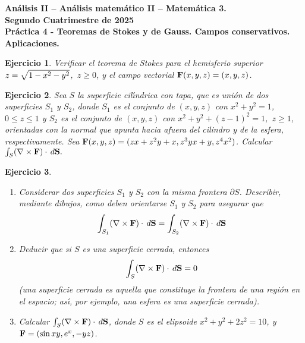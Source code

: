 \documentclass[11pt,a4paper,pdftex]{amsart}
\newtheorem{ej}{Ejercicio}%
\newcommand{\bej}[1]{\begin{ej}\rm{#1}}
\newcommand{\eej}{\end{ej}\vspace{-0.2cm}}
\renewcommand{\bf}{\textbf}
\newcommand{\0}{\mathbb O}
\newcommand{\8}{\infty}
\begin{document}

\begin{center}

\bf{\Large An\'alisis II -- An\'alisis matem\'atico II -- Matem\'atica 3.} \\
\bigskip
\bf{\large Segundo Cuatrimestre de 2025}\\
\bigskip
\bf{Pr\'actica 4 - Teoremas de Stokes y de Gauss. Campos conservativos. Aplicaciones.}
\end{center}

\bigskip\bigskip

\setcounter{equation}{0}

\bej  Verificar el teorema de Stokes para el hemisferio superior $z=\sqrt{%
1-x^2-y^2}$,\ $z\ge 0$, y el campo vectorial  ${\bf F}(x,y,z)=(x,y,z)$.
\eej

\bej  Sea $S$ la superficie cil\'{\i }ndrica con tapa, que es uni\'{o}n de
dos superficies $S_1$ y $S_2$, donde $S_1$ es el conjunto de $(x,y,z)$ con $%
x^2+y^2=1$, \ $0\le z\le 1$ y $S_2$ es el conjunto de $(x,y,z)$ con $%
x^2+y^2+(z-1)^2=1$,\ $z\geq 1$, orientadas con la normal que apunta hacia afuera
del cilindro y de la esfera, respectivamente. Sea ${\bf F}%
(x,y,z)=(zx+z^2y+x,z^3yx+y,z^4x^2)$. Calcular $\int_S(\nabla \times {\bf F}%
)\cdot \,d{\bf S}.$
\eej

\bej\ \

\begin{enumerate}
\item[a).]  Considerar dos superficies $S_1$ y $S_2$ con la misma frontera $%
\partial S$. Describir, mediante dibujos, como deben orientarse $S_1$ y $S_2$
para asegurar que
\[
\int_{S_1}(\nabla \times {\bf F})\cdot \,d{\bf S}=\int_{S_2}(\nabla \times
{\bf F})\cdot \,d{\bf S}
\]

\item[b).]  Deducir que si $S$ es una superficie cerrada, entonces
\[
\int_S(\nabla \times {\bf F})\cdot \,d{\bf S}=0
\]
(una superficie cerrada es aquella que constituye la frontera de una
regi\'{o}n en el espacio; as\'{\i }, por ejemplo, una esfera es una
superficie cerrada).

\item[c).]  Calcular $\int_S(\nabla \times {\bf F})\cdot \,d{\bf S}$, donde $S$
es el elipsoide $x^2+y^2+2z^2=10$, y ${\bf F}=(\sin xy,e^x,-yz)$.
\end{enumerate}
\eej

\end{document}
